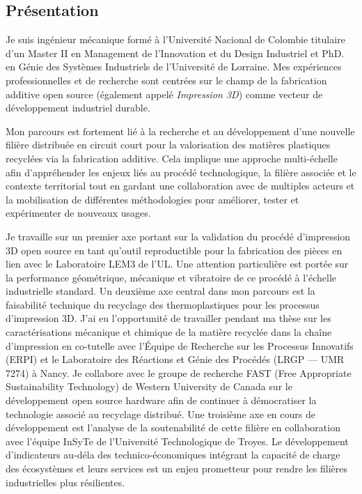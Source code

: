 \documentclass[
  11pt,
]{article}
\begin{document}
\hypertarget{pruxe9sentation}{%
\subsection{Présentation}\label{pruxe9sentation}}

Je suis ingénieur mécanique formé à l'Université Nacional de Colombie
titulaire d'un Master II en Management de l'Innovation et du Design
Industriel et PhD. en Génie des Systèmes Industriels de l'Université de
Lorraine. Mes expériences professionnelles et de recherche sont centrées
sur le champ de la fabrication additive open source (également appelé
\emph{Impression 3D}) comme vecteur de développement industriel durable.

Mon parcours est fortement lié à la recherche et au développement d'une
nouvelle filière distribuée en circuit court pour la valorisation des
matières plastiques recyclées via la fabrication additive. Cela implique
une approche multi-échelle afin d'appréhender les enjeux liés au procédé
technologique, la filière associée et le contexte territorial tout en
gardant une collaboration avec de multiples acteurs et la mobilisation
de différentes méthodologies pour améliorer, tester et expérimenter de
nouveaux usages.

Je travaille sur un premier axe portant sur la validation du procédé
d'impression 3D open source en tant qu'outil reproductible pour la
fabrication des pièces en lien avec le Laboratoire LEM3 de l'UL. Une
attention particulière est portée sur la performance géométrique,
mécanique et vibratoire de ce procédé à l'échelle industrielle standard.
Un deuxième axe central dans mon parcours est la faisabilité technique
du recyclage des thermoplastiques pour les processus d'impression 3D.
J'ai eu l'opportunité de travailler pendant ma thèse sur les
caractérisations mécanique et chimique de la matière recyclée dans la
chaîne d'impression en co-tutelle avec l'Équipe de Recherche sur les
Processus Innovatifs (ERPI) et le Laboratoire des Réactions et Génie des
Procédés (LRGP --- UMR 7274) à Nancy. Je collabore avec le groupe de
recherche FAST (Free Appropriate Sustainability Technology) de Western
University de Canada sur le développement open source hardware afin de
continuer à démocratiser la technologie associé au recyclage distribué.
Une troisième axe en cours de développement est l'analyse de la
soutenabilité de cette filière en collaboration avec l'équipe InSyTe de
l'Université Technologique de Troyes. Le développement d'indicateurs
au-déla des technico-économiques intégrant la capacité de charge des
écosystèmes et leurs services est un enjeu prometteur pour rendre les
filières industrielles plus résilientes.
\end{document}
